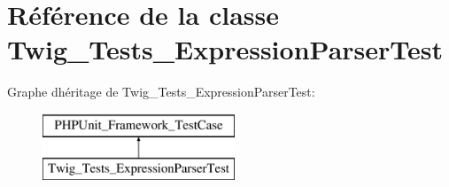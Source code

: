 \hypertarget{class_twig___tests___expression_parser_test}{}\section{Référence de la classe Twig\+\_\+\+Tests\+\_\+\+Expression\+Parser\+Test}
\label{class_twig___tests___expression_parser_test}
Graphe d\textquotesingle{}héritage de Twig\+\_\+\+Tests\+\_\+\+Expression\+Parser\+Test\+:\begin{figure}[H]
\begin{center}
\leavevmode
\includegraphics[height=2.000000cm]{class_twig___tests___expression_parser_test}
\end{center}
\end{figure}
